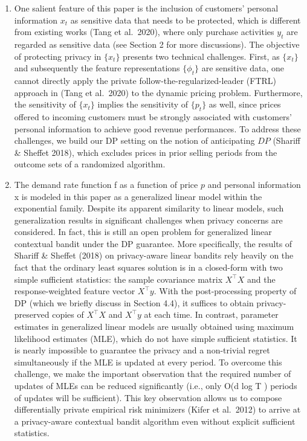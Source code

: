 \begin{enumerate}
\def\labelenumi{\arabic{enumi}.}
\item
  One salient feature of this paper is the inclusion of customers' personal information \(x _ { t }\) as sensitive data that needs to be protected, which is different from existing works (Tang et al.~2020), where only purchase activities \(y _ { t }\) are regarded as sensitive data (see Section 2 for more discussions). The objective of protecting privacy in \(\{ x _ { t } \}\) presents two technical challenges. First, as \(\{ x _ { t } \}\) and subsequently the feature representations \(\{ \phi _ { t } \}\) are sensitive data, one cannot directly apply the private follow-the-regularized-leader (FTRL) approach in (Tang et al.~2020) to the dynamic pricing problem. Furthermore, the sensitivity of \(\{ x _ { t } \}\) implies the sensitivity of \(\{ p _ { t } \}\) as well, since prices offered to incoming customers must be strongly associated with customers' personal information to achieve good revenue performances. To address these challenges, we build our DP setting on the notion of anticipating \(D P\) (Shariff \& Sheffet 2018), which excludes prices in prior selling periods from the outcome sets of a randomized algorithm.
\item
  The demand rate function f as a function of price \(p\) and personal information x is modeled in this paper as a generalized linear model within the exponential family. Despite its apparent similarity to linear models, such generalization results in significant challenges when privacy concerns are considered. In fact, this is still an open problem for generalized linear contextual bandit under the DP guarantee. More specifically, the results of Shariff \& Sheffet (2018) on privacy-aware linear bandits rely heavily on the fact that the ordinary least squares solution is in a closed-form with two simple sufficient statistics: the sample covariance matrix \(X ^ { \top } X\) and the response-weighted feature vector \(X ^ { \top } y\). With the post-processing property of DP (which we briefly discuss in Section 4.4), it suffices to obtain privacy-preserved copies of \(X ^ { \top } X\) and \(X ^ { \top } y\) at each time. In contrast, parameter estimates in generalized linear models are usually obtained using maximum likelihood estimates (MLE), which do not have simple sufficient statistics. It is nearly impossible to guarantee the privacy and a non-trivial regret simultaneously if the MLE is updated at every period. To overcome this challenge, we make the important observation that the required number of updates of MLEs can be reduced significantly (i.e., only O(d log T ) periods of updates will be sufficient). This key observation allows us to compose differentially private empirical risk minimizers (Kifer et al.~2012) to arrive at a privacy-aware contextual bandit algorithm even without explicit sufficient statistics.

\end{enumerate}
